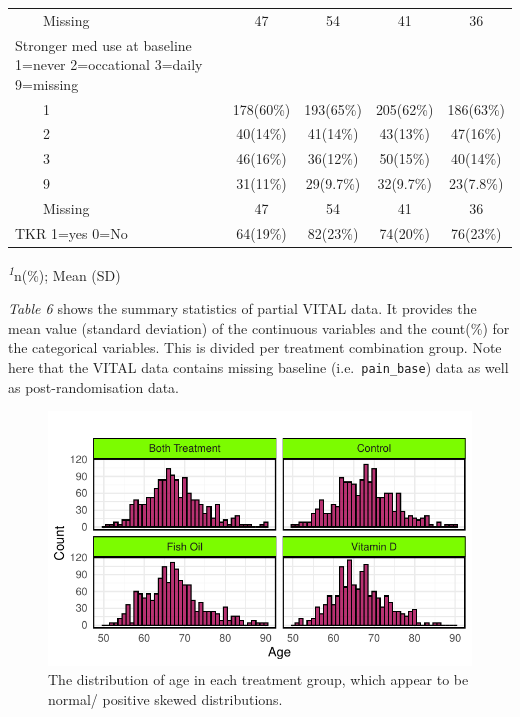 \documentclass{article}
\begin{document}
\begin{table}[!t]
\begin{tabular*}{\linewidth}{@{\extracolsep{\fill}}lcccc}
    Missing & 47 & 54 & 41 & 36 \\ 
Stronger med use at baseline 1=never 2=occational 3=daily 9=missing &  &  &  &  \\ 
    1 & 178(60\%) & 193(65\%) & 205(62\%) & 186(63\%) \\ 
    2 & 40(14\%) & 41(14\%) & 43(13\%) & 47(16\%) \\ 
    3 & 46(16\%) & 36(12\%) & 50(15\%) & 40(14\%) \\ 
    9 & 31(11\%) & 29(9.7\%) & 32(9.7\%) & 23(7.8\%) \\ 
    Missing & 47 & 54 & 41 & 36 \\ 
TKR 1=yes 0=No & 64(19\%) & 82(23\%) & 74(20\%) & 76(23\%) \\ 
\bottomrule
\end{tabular*}
\begin{minipage}{\linewidth}
\textsuperscript{\textit{1}}n(\%); Mean (SD)\\
\end{minipage}
\end{table}

\emph{Table 6} shows the summary statistics of partial VITAL data. It
provides the mean value (standard deviation) of the continuous variables
and the count(\%) for the categorical variables. This is divided per
treatment combination group. Note here that the VITAL data contains
missing baseline (i.e.~\texttt{pain\_base}) data as well as
post-randomisation data.

\begin{figure}

{\centering \includegraphics{Final_Report_files/figure-latex/unnamed-chunk-14-1} 

}

\caption{The distribution of age in each treatment group, which appear to be normal/ positive skewed distributions.}\label{fig:unnamed-chunk-14}
\end{figure}
\end{document}

